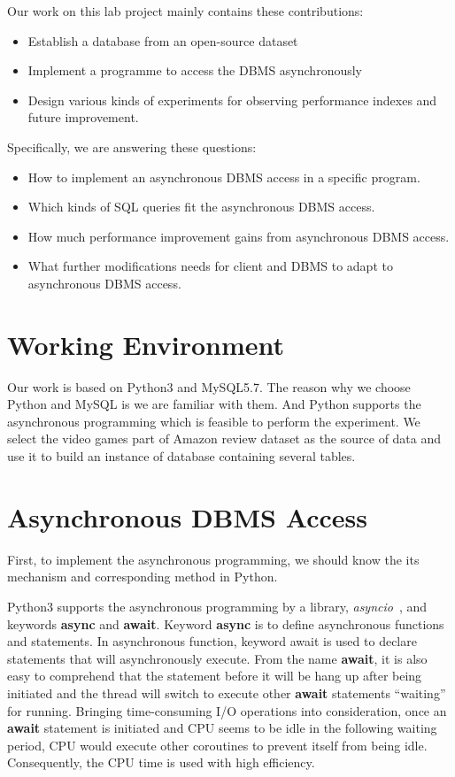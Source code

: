 \documentclass[onecolumn, conference, 12pt]{IEEEtran}
\begin{document}
	Our work on this lab project mainly contains these contributions:
	\begin{itemize}
		\item Establish a database from an open-source dataset
		\item Implement a programme to access the DBMS asynchronously
		\item Design various kinds of experiments for observing performance indexes and future improvement.
	\end{itemize}

	Specifically, we are answering these questions:
	\begin{itemize}
		\item How to implement an asynchronous DBMS access in a specific program.
		\item Which kinds of SQL queries fit the asynchronous DBMS access.
		\item How much performance improvement gains from asynchronous DBMS access.
		\item What further modifications needs for client and DBMS to adapt to asynchronous DBMS access.
	\end{itemize}
	
	\section{Working Environment}
	Our work is based on Python3 and MySQL5.7. The reason why we choose Python and MySQL is we are familiar with them. And Python supports the asynchronous programming which is feasible to perform the experiment. We select the video games part of Amazon review dataset as the source of data and use it to build an instance of database containing several tables.

	\section{Asynchronous DBMS Access}
	First, to implement the asynchronous programming, we should know the its mechanism and corresponding method in Python. 

	Python3 supports the asynchronous programming by a library, \textit{asyncio}~\cite{asyncio}, and keywords \textbf{async} and \textbf{await}. Keyword \textbf{async} is to define asynchronous functions and statements. In asynchronous function, keyword await is used to declare statements that will asynchronously execute. From the name \textbf{await}, it is also easy to comprehend that the statement before it will be hang up after being initiated and the thread will switch to execute other \textbf{await} statements ``waiting'' for running. Bringing time-consuming I/O operations into consideration, once an \textbf{await} statement is initiated and CPU seems to be idle in the following waiting period, CPU would execute other coroutines to prevent itself from being idle. Consequently, the CPU time is used with high efficiency. 
\end{document}
